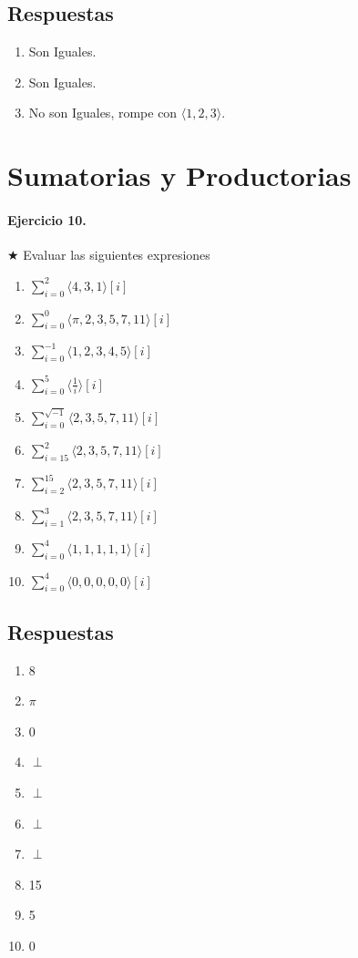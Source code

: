 \documentclass[a4paper]{article}
\begin{document}
\subsection*{Respuestas}
\begin{enumerate}[label=\alph*)]
	\item Son Iguales.
	\item Son Iguales.
	\item No son Iguales, rompe con $\langle 1,2,3\rangle$.
\end{enumerate}

\section{Sumatorias y Productorias}

\paragraph{Ejercicio 10.} $\bigstar $ Evaluar las siguientes expresiones
\begin{multicols}{2}
\begin{enumerate}[label=\alph*)]
\item $\sum_{i=0}^2 \langle 4,3,1 \rangle [i]$
\item $\sum_{i=0}^0 \langle \pi,2,3,5,7,11 \rangle [i]$
\item $\sum_{i=0}^{-1} \langle 1,2,3,4,5 \rangle [i]$
\item $\sum_{i=0}^5 \langle \frac{1}{i} \rangle [i]$
\item $\sum_{i=0}^{\sqrt{-1}} \langle 2,3,5,7,11 \rangle [i]$
\item $\sum_{i=15}^2 \langle 2,3,5,7,11 \rangle [i]$
\item $\sum_{i=2}^{15} \langle 2,3,5,7,11\rangle [i]$
\item $\sum_{i=1}^3 \langle 2,3,5,7,11 \rangle [i]$
\item $\sum_{i=0}^4 \langle 1,1,1,1,1 \rangle [i]$
\item $\sum_{i=0}^4 \langle 0,0,0,0,0 \rangle [i]$
\end{enumerate}
\end{multicols}

\subsection*{Respuestas}
\begin{multicols}{2}
\begin{enumerate}[label=\alph*)]
	\item 8
	\item $\pi$
	\item 0
	\item $\perp$
	\item $\perp$
	\item $\perp$
	\item $\perp$
	\item 15
	\item 5
	\item 0
\end{enumerate}
\end{multicols}
\end{document}
